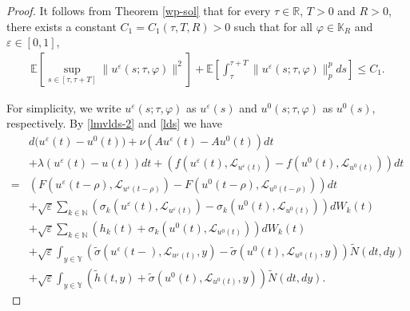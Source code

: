 \documentclass[11pt]{article}
\numberwithin{equation}{section}
\theoremstyle{plain}
\begin{document}
 \begin{proof}
  It follows from Theorem \ref{wp-sol} that for every
      $\tau \in \mathbb{R}$, $T> 0$ and $R > 0$,
  there exists a constant $C_1 = C_1(\tau, T, R) > 0$
  such that for all $\varphi \in \mathbb{K}_R$ and $\varepsilon \in [0,1]$,
  \begin{align} \label{scp-1}
        \mathbb{E}
              \left[ \sup_{s \in [\tau,\tau+T]}
                           \| u^\varepsilon(s; \tau, \varphi) \|^2
              \right]
           + \mathbb{E}
                \left[ \int_{\tau}^{\tau+T}
                             \| u^\varepsilon(s; \tau, \varphi) \|^p_p ds
                \right]
    \le C_1.
  \end{align}
 
  For simplicity,
  we write $u^\varepsilon(s; \tau, \varphi)$ as $u^\varepsilon(s)$ and $u^0(s; \tau, \varphi)$ as $u^0(s)$, respectively.
  By \eqref{lmvlds-2} and \eqref{lds} we have
  \begin{align}\label{scp-2}
     & d \Big( u^\varepsilon(t) - u^0(t) \Big)
       + \nu \left( A u^\varepsilon(t) - A u^0(t) \right) dt \nonumber\\
     & + \lambda \left(u^\varepsilon(t) - u(t) \right)  dt
       + \left( f(u^\varepsilon(t),\mathcal{L}_{u^\varepsilon(t)})
                 - f(u^0(t),\mathcal{L}_{u^0(t)} ) \right)dt \nonumber \\
   = & \left( F(u^\varepsilon(t -\rho), \mathcal{L}_{u^\varepsilon(t -\rho)} )
               - F(u^0(t-\rho), \mathcal{L}_{u^0(t-\rho)} ) \right) dt \nonumber\\
      & + \sqrt{\varepsilon} \sum_{k \in \mathbb{N} }
                \left( \sigma_k(u^\varepsilon(t), \mathcal{L}_{u^\varepsilon(t)})
                         - \sigma_k(u^0(t), \mathcal{L}_{u^0(t)})
                \right) dW_k(t)  \nonumber\\
      & + \sqrt{\varepsilon} \sum_{k \in \mathbb{N} }
                   \left( h_k(t)
                            + \sigma_k(u^0(t), \mathcal{L}_{u^0(t)}) 
                   \right) dW_k(t)  \nonumber \\
      & + \sqrt{\varepsilon} \int_{y \in \mathbb{Y} }
                  \left( \widetilde{\sigma}(u^\varepsilon(t-), \mathcal{L}_{u^\varepsilon(t)}, y)
                            - \widetilde{\sigma}(u^0(t), \mathcal{L}_{u^0(t)}, y)
                  \right) \widetilde{N}(dt,dy)  \nonumber \\
      & + \sqrt{\varepsilon} \int_{y \in \mathbb{Y} }
                    \left( \widetilde{h}(t,y) 
                             + \widetilde{\sigma}(u^0(t), \mathcal{L}_{u^0(t)}, y)
                    \right) \widetilde{N}(dt,dy).
  \end{align}
 

\end{proof}
\end{document}
